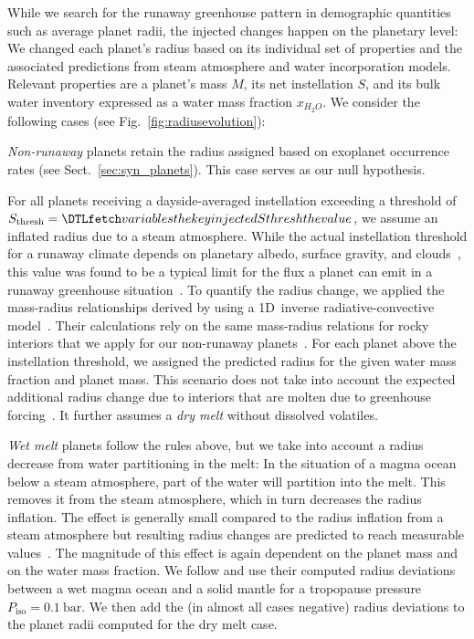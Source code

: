 \documentclass[twocolumn]{aastex631}
\begin{document}
While we search for the runaway greenhouse pattern in demographic quantities such as average planet radii, the injected changes happen on the planetary level: We changed each planet's radius based on its individual set of properties and the associated predictions from steam atmosphere and water incorporation models.
Relevant properties are a planet's mass $M$, its net instellation $S$, and its bulk water inventory expressed as a water mass fraction $x_{H_2O}$.
We consider the following cases (see Fig.~\ref{fig:radiusevolution}):

\textit{Non-runaway} planets retain the radius assigned based on exoplanet occurrence rates (see Sect.~\ref{sec:syn_planets}).
This case serves as our null hypothesis.

For all planets receiving a dayside-averaged instellation exceeding a threshold of $S_\mathrm{thresh} = \var{injectedSthresh}$, we assume an inflated radius due to a steam atmosphere.
While the actual instellation threshold for a runaway climate depends on planetary albedo, surface gravity, and clouds~\citep{Pierrehumbert2022}, this value was found to be a typical limit for the flux a planet can emit in a runaway greenhouse situation~\citep{Abe1988,Kasting1988,Nakajima1992,Goldblatt2013,Leconte2013,Boukrouche2021}.
To quantify the radius change, we applied the mass-radius relationships derived by \citet{Turbet2020} using a 1D~inverse radiative-convective model~\citep{Turbet2019}.
Their calculations rely on the same mass-radius relations for rocky interiors that we apply for our non-runaway planets~\citep{Zeng2016}.
For each planet above the instellation threshold, we assigned the predicted radius for the given water mass fraction and planet mass.
This scenario does not take into account the expected additional radius change due to interiors that are molten due to greenhouse forcing~\citep{Bower2019}.
It further assumes a \textit{dry melt} without dissolved volatiles.

\textit{Wet melt} planets follow the rules above, but we take into account a radius decrease from water partitioning in the melt:
In the situation of a magma ocean below a steam atmosphere, part of the water will partition into the melt.
This removes it from the steam atmosphere, which in turn decreases the radius inflation.
The effect is generally small compared to the radius inflation from a steam atmosphere but resulting radius changes are predicted to reach measurable values~\citep{Dorn2021}.
The magnitude of this effect is again dependent on the planet mass and on the water mass fraction.
We follow \citet{Dorn2021} and use their computed radius deviations between a wet magma ocean and a solid mantle for a tropopause pressure~$P_\mathrm{iso}=\SI{0.1}{\bar}$.
We then add the (in almost all cases negative) radius deviations to the planet radii computed for the dry melt case.
\end{document}
